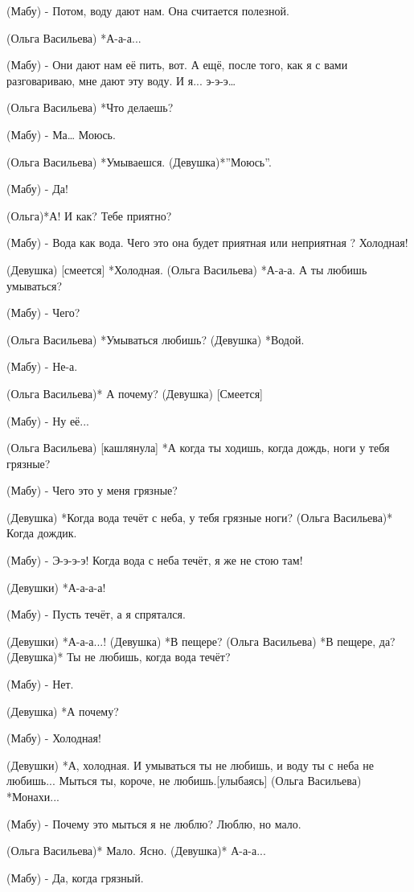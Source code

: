 (Мабу) - Потом, воду дают нам. Она считается полезной.

(Ольга Васильева) *А-а-а...

(Мабу)  - Они дают нам её пить, вот. А ещё, после того, как я с вами разговариваю,  мне дают эту воду. И я... э-э-э…

(Ольга Васильева) *Что делаешь?

(Мабу) - Ма… Моюсь.
 
(Ольга Васильева) *Умываешся.
(Девушка)*”Моюсь”.

(Мабу) - Да!

(Ольга)*А! И как? Тебе приятно?

(Мабу) - Вода как вода. Чего это она будет  приятная или неприятная ? Холодная!

(Девушка) [смеется] *Холодная.
(Ольга Васильева) *А-а-а. А ты любишь умываться?

(Мабу) - Чего?

(Ольга Васильева) *Умываться любишь?
(Девушка) *Водой.

(Мабу) - Не-а.

(Ольга Васильева)* А почему?
(Девушка) [Смеется]

(Мабу) - Ну её... 

(Ольга Васильева) [кашлянула] *А когда ты ходишь, когда дождь, ноги у тебя грязные?

(Мабу) - Чего это у меня грязные?

(Девушка) *Когда вода течёт с неба, у тебя грязные ноги?
(Ольга Васильева)* Когда дождик.

(Мабу) - Э-э-э-э! Когда вода с неба течёт, я же не стою там!

(Девушки) *А-а-а-а!

(Мабу) - Пусть течёт, а я спрятался.

(Девушки) *А-а-а...!
(Девушка) *В пещере?
(Ольга Васильева) *В пещере, да?
(Девушка)* Ты не любишь, когда вода течёт?

(Мабу) - Нет.

(Девушка) *А почему?

(Мабу) - Холодная!

(Девушки) *А, холодная. И умываться ты не любишь, и воду ты с неба не любишь... Мыться ты, короче, не любишь.[улыбаясь]
(Ольга Васильева) *Монахи...

(Мабу) - Почему это мыться я не люблю? Люблю, но мало.

(Ольга Васильева)* Мало. Ясно.
(Девушка)* А-а-а...

(Мабу) - Да, когда грязный.

